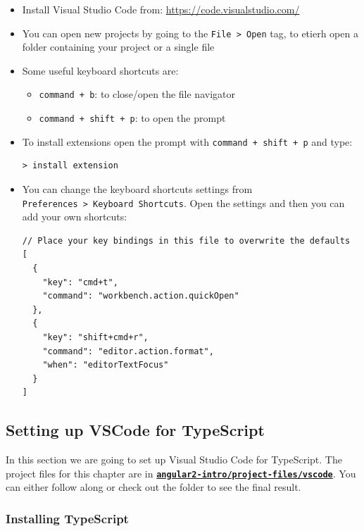 \documentclass[12pt,]{article}
\providecommand{\tightlist}{%
  \setlength{\itemsep}{0pt}\setlength{\parskip}{0pt}}
\begin{document}
\begin{itemize}
\item
  Install Visual Studio Code from: \url{https://code.visualstudio.com/}
\item
  You can open new projects by going to the
  \texttt{File\ \textgreater{}\ Open} tag, to etierh open a folder
  containing your project or a single file
\item
  Some useful keyboard shortcuts are:

  \begin{itemize}
  \tightlist
  \item
    \texttt{command\ +\ b}: to close/open the file navigator
  \item
    \texttt{command\ +\ shift\ +\ p}: to open the prompt
  \end{itemize}
\item
  To install extensions open the prompt with
  \texttt{command\ +\ shift\ +\ p} and type:

\begin{verbatim}
> install extension
\end{verbatim}
\item
  You can change the keyboard shortcuts settings from
  \texttt{Preferences\ \textgreater{}\ Keyboard\ Shortcuts}. Open the
  settings and then you can add your own shortcuts:

\begin{verbatim}
// Place your key bindings in this file to overwrite the defaults
[
  {
    "key": "cmd+t",
    "command": "workbench.action.quickOpen"
  },
  {
    "key": "shift+cmd+r",
    "command": "editor.action.format",
    "when": "editorTextFocus"
  }
]
\end{verbatim}
\end{itemize}

\subsection{Setting up VSCode for
TypeScript}\label{setting-up-vscode-for-typescript}

In this section we are going to set up Visual Studio Code for
TypeScript. The project files for this chapter are in
\href{https://github.com/aminmeyghani/angular2-intro/tree/master/project-files/vscode}{\textbf{\texttt{angular2-intro/project-files/vscode}}}.
You can either follow along or check out the folder to see the final
result.

\subsubsection{Installing TypeScript}\label{installing-typescript}
\end{document}
